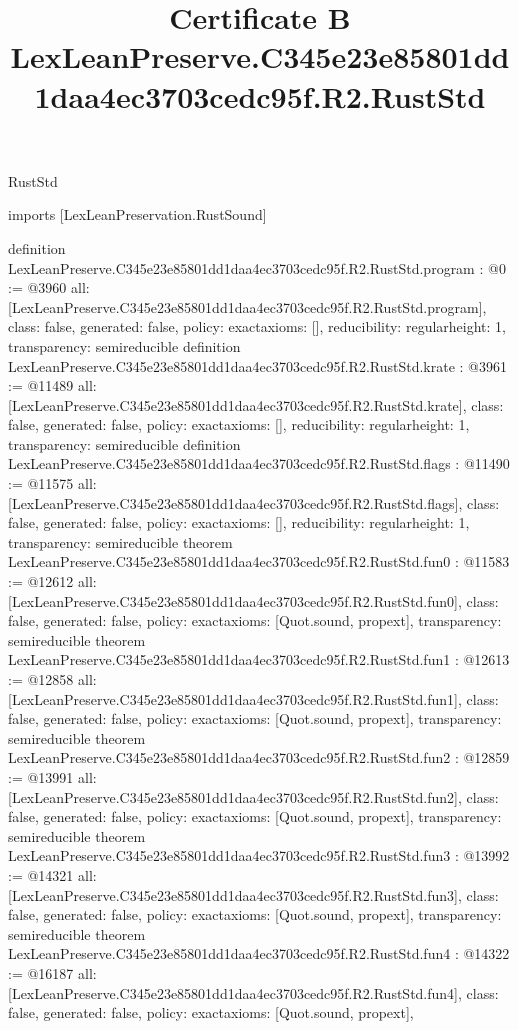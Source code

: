 \begin{lexlean}{RustStd}
\title{Certificate B LexLeanPreserve.C345e23e85801dd1daa4ec3703cedc95f.R2.RustStd}
\begin{coremodule}
imports [LexLeanPreservation.RustSound]

definition LexLeanPreserve.C345e23e85801dd1daa4ec3703cedc95f.R2.RustStd.program : @0 := @3960 {
  all: [LexLeanPreserve.C345e23e85801dd1daa4ec3703cedc95f.R2.RustStd.program],
  class: false,
  generated: false,
  policy: exact{axioms: []},
  reducibility: regular{height: 1},
  transparency: semireducible
}
definition LexLeanPreserve.C345e23e85801dd1daa4ec3703cedc95f.R2.RustStd.krate : @3961 := @11489 {
  all: [LexLeanPreserve.C345e23e85801dd1daa4ec3703cedc95f.R2.RustStd.krate],
  class: false,
  generated: false,
  policy: exact{axioms: []},
  reducibility: regular{height: 1},
  transparency: semireducible
}
definition LexLeanPreserve.C345e23e85801dd1daa4ec3703cedc95f.R2.RustStd.flags : @11490 := @11575 {
  all: [LexLeanPreserve.C345e23e85801dd1daa4ec3703cedc95f.R2.RustStd.flags],
  class: false,
  generated: false,
  policy: exact{axioms: []},
  reducibility: regular{height: 1},
  transparency: semireducible
}
theorem LexLeanPreserve.C345e23e85801dd1daa4ec3703cedc95f.R2.RustStd.fun0 : @11583 := @12612 {
  all: [LexLeanPreserve.C345e23e85801dd1daa4ec3703cedc95f.R2.RustStd.fun0],
  class: false,
  generated: false,
  policy: exact{axioms: [Quot.sound, propext]},
  transparency: semireducible
}
theorem LexLeanPreserve.C345e23e85801dd1daa4ec3703cedc95f.R2.RustStd.fun1 : @12613 := @12858 {
  all: [LexLeanPreserve.C345e23e85801dd1daa4ec3703cedc95f.R2.RustStd.fun1],
  class: false,
  generated: false,
  policy: exact{axioms: [Quot.sound, propext]},
  transparency: semireducible
}
theorem LexLeanPreserve.C345e23e85801dd1daa4ec3703cedc95f.R2.RustStd.fun2 : @12859 := @13991 {
  all: [LexLeanPreserve.C345e23e85801dd1daa4ec3703cedc95f.R2.RustStd.fun2],
  class: false,
  generated: false,
  policy: exact{axioms: [Quot.sound, propext]},
  transparency: semireducible
}
theorem LexLeanPreserve.C345e23e85801dd1daa4ec3703cedc95f.R2.RustStd.fun3 : @13992 := @14321 {
  all: [LexLeanPreserve.C345e23e85801dd1daa4ec3703cedc95f.R2.RustStd.fun3],
  class: false,
  generated: false,
  policy: exact{axioms: [Quot.sound, propext]},
  transparency: semireducible
}
theorem LexLeanPreserve.C345e23e85801dd1daa4ec3703cedc95f.R2.RustStd.fun4 : @14322 := @16187 {
  all: [LexLeanPreserve.C345e23e85801dd1daa4ec3703cedc95f.R2.RustStd.fun4],
  class: false,
  generated: false,
  policy: exact{axioms: [Quot.sound, propext]},
}
\end{coremodule}
\end{lexlean}
